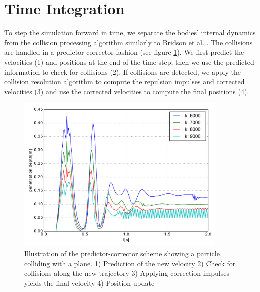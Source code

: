 \section{Time Integration}
\label{sec:TimeIntegration}
To step the simulation forward in time, we separate the bodies' internal dynamics from the collision processing algorithm similarly to Bridson et al. \cite{BRIDSON2002}.
The collisions are handled in a predictor-corrector fashion (see figure \ref{fig:pre_corr}). We first predict the velocities (1) and positions at the end of the time step, then we use the predicted information to check for collisions (2). If collisions are detected, we apply the collision resolution algorithm to compute the repulsion impulses and corrected velocities (3) and use the corrected velocities to compute the final positions (4).
\begin{figure}[h] 
  \centering
     \includegraphics[width=0.9\textwidth]{pics/pdf/pre_corr.pdf}
  \caption[Predictor-Corrector scheme]{Illustration of the predictor-corrector scheme showing a particle colliding with a plane. 1) Prediction of the new velocity  2) Check for collisions along the new trajectory
  3) Applying correction impulses yields the final velocity
  4) Position update}
  \label{fig:pre_corr}
\end{figure}

